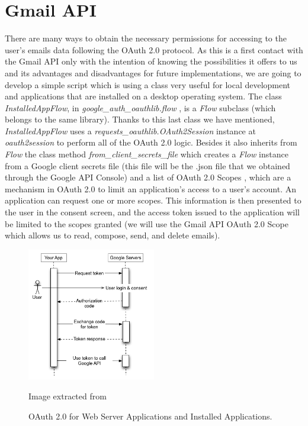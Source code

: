 \section{Gmail API}\label{sect:gmailapi}

There are many ways to obtain the necessary permissions for accessing to the user's emails data following the OAuth 2.0 protocol. As this is a first contact with the Gmail API only with the intention of knowing the possibilities it offers to us and its advantages and disadvantages for future implementations, we are going to develop a simple script which is using a class very useful for local development and applications that are installed on a desktop operating system. The class \textit{InstalledAppFlow}, in \textit{google\_auth\_oauthlib.flow} \citep{oauthlib}, is a \textit{Flow} subclass (which belongs to the same library). Thanks to this last class we have mentioned, \textit{InstalledAppFlow} uses a \textit{requests\_oauthlib.OAuth2Session} instance at \textit{oauth2session} to perform all of the OAuth 2.0 logic. Besides it also inherits from \textit{Flow} the class method \textit{from\_client\_secrets\_file} which creates a \textit{Flow} instance from a Google client secrets file (this file will be the .json file that we obtained through the Google API Console) and a list of OAuth 2.0 Scopes \citep{oauth-scopes}, which are a mechanism  in OAuth 2.0 to limit an application's access to a user's account. An application can request one or more scopes. This information is then presented to the user in the consent screen, and the access token issued to the application will be limited to the scopes granted (we will use the Gmail API OAuth 2.0 Scope which allows us to read, compose, send, and delete emails).

\begin{figure}[h]
	\centering%
	\includegraphics[width = 0.5\textwidth]{Imagenes/Bitmap/webflow.png}%
	\caption{OAuth 2.0 for Web Server Applications and Installed Applications.}%
	Image extracted from \cite{oauth}
	\label{fig:oauth}
\end{figure}

